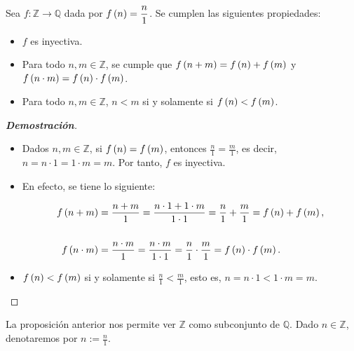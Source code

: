 \begin{proposition}
  \rm Sea $f:\mathbb{Z}\rightarrow\mathbb{Q}$ dada por $\displaystyle f\left(n\right)=\frac{n}{1}$. Se cumplen las siguientes propiedades:

  \begin{itemize}
    \item[1.] $f$ es inyectiva.
    \item[2.] Para todo $n,m\in\mathbb{Z}$, se cumple que $f\left(n+m\right)=f\left(n\right)+f\left(m\right)$ y $f\left(n\cdot m\right)=f\left(n\right)\cdot f\left(m\right)$.
    \item[3.] Para todo $n,m\in\mathbb{Z}$, $n<m$ si y solamente si $f\left(n\right)<f\left(m\right)$. 
  \end{itemize}
  \begin{proof}[\rm\textbf{Demostración}]
    \hfill
    \begin{itemize}
    \item[1.] Dados $n,m\in\mathbb{Z}$, si $f\left(n\right)=f\left(m\right)$, entonces $\frac{n}{1}=\frac{m}{1}$, es decir, $n=n\cdot 1=1\cdot m=m$. Por tanto, $f$ es inyectiva.
    \item[2.] En efecto, se tiene lo siguiente:
    
    \begin{equation}
        \begin{split}
            f\left(n+m\right) & =\frac{n+m}{1}=\frac{n\cdot 1+1\cdot m}{1\cdot 1}=\frac{n}{1}+\frac{m}{1}=f\left(n\right)+f\left(m\right),\\
            \\
            f\left(n\cdot m\right) & =\frac{n\cdot m}{1}=\frac{n\cdot m}{1\cdot 1}=\frac{n}{1}\cdot\frac{m}{1}=f\left(n\right)\cdot f\left(m\right).
        \end{split}
    \end{equation}
    \item[3.] $f\left(n\right)<f\left(m\right)$ si y solamente si $\frac{n}{1}<\frac{m}{1}$, esto es, $n=n\cdot 1<1\cdot m=m$.
  \end{itemize}
  \end{proof}
  
\end{proposition}

La proposición anterior nos permite ver $\mathbb{Z}$ como subconjunto de $\mathbb{Q}$. Dado $n\in\mathbb{Z}$, denotaremos por $n:=\frac{n}{1}$. 

